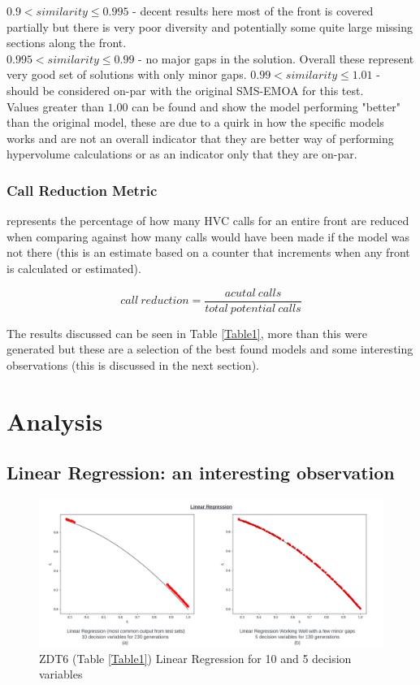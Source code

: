 \documentclass[sigconf,review,nonacm]{acmart}
\begin{document}
$0.9 < similarity \leq 0.995 $ - decent results here most of the front is covered partially but there is very poor diversity and potentially some quite large missing sections along the front. \\

$0.995 < similarity \leq 0.99 $ - no major gaps in the solution. Overall these represent very good set of solutions with only minor gaps.  $0.99 < similarity \leq 1.01$ - should be considered on-par with the original SMS-EMOA for this test. \\ Values greater than $1.00$ can be found and show the model performing  "better" than the original model, these are due to a quirk in how the specific models works and are not an overall indicator that they are better way of performing hypervolume calculations or as an indicator only that they are on-par.

\subsubsection{Call Reduction Metric} 

represents the percentage of how many HVC calls for an entire front are reduced when comparing against how many calls would have been made if the model was not there (this is an estimate based on a counter that increments when any front is calculated or estimated).

$$
    call\ reduction = \frac{acutal\ calls}{total\ potential\ calls}
$$

The results discussed can be seen in Table \ref{Table1}, more than this were generated but these are a selection of the best found models and some interesting observations (this is discussed in the next section). 









 
\section{Analysis}
\label{analysis}

\subsection{Linear Regression: an interesting observation}

\begin{figure}[H]
    \centering
    \includegraphics[width=0.85\linewidth]{Images/LinearRegression.png}
    \caption{ZDT6 (Table \ref{Table1}) Linear Regression for 10 and 5 decision variables}
    \label{fig:linear-regression-two}
\end{figure}
\end{document}
